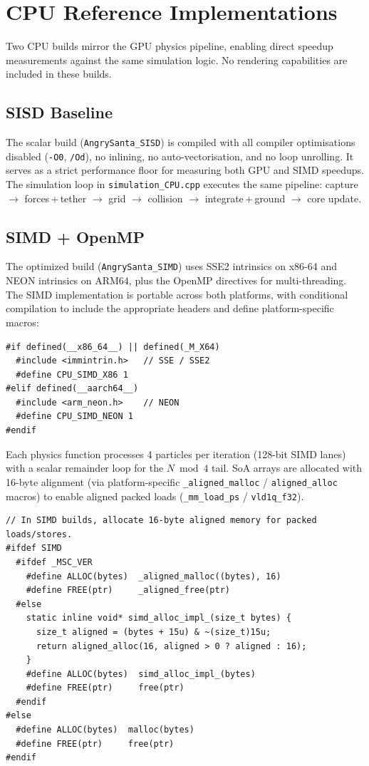 \section{CPU Reference Implementations}
\label{sec:cpu}

Two CPU builds mirror the GPU physics pipeline, enabling direct speedup
measurements against the same simulation logic. No rendering capabilities are included in these builds.

\subsection{SISD Baseline}

The scalar build (\texttt{AngrySanta\_SISD}) is compiled with all compiler
optimisations disabled (\texttt{-O0}, \texttt{/Od}), no inlining, no
auto-vectorisation, and no loop unrolling. It serves as a strict performance
floor for measuring both GPU and SIMD speedups. The simulation loop in
\texttt{simulation\_CPU.cpp} executes the same pipeline: capture $\to$
forces\,+\,tether $\to$ grid $\to$ collision $\to$ integrate\,+\,ground $\to$
core update.

\subsection{SIMD + OpenMP}

The optimized build (\texttt{AngrySanta\_SIMD}) uses SSE2 intrinsics on x86-64
and NEON intrinsics on ARM64, plus the OpenMP directives for multi-threading.
The SIMD implementation is portable across both platforms, with conditional
compilation to include the appropriate headers and define platform-specific macros:

\begin{lstlisting}
#if defined(__x86_64__) || defined(_M_X64)
  #include <immintrin.h>   // SSE / SSE2
  #define CPU_SIMD_X86 1
#elif defined(__aarch64__)
  #include <arm_neon.h>    // NEON
  #define CPU_SIMD_NEON 1
#endif
\end{lstlisting}

Each physics function processes 4 particles per iteration (128-bit SIMD lanes)
with a scalar remainder loop for the $N \bmod 4$ tail. SoA arrays are allocated
with 16-byte alignment (via platform-specific \texttt{\_aligned\_malloc} /
\texttt{aligned\_alloc} macros) to enable aligned packed loads
(\texttt{\_mm\_load\_ps} / \texttt{vld1q\_f32}).

\begin{lstlisting}
// In SIMD builds, allocate 16-byte aligned memory for packed loads/stores.
#ifdef SIMD
  #ifdef _MSC_VER
    #define ALLOC(bytes)  _aligned_malloc((bytes), 16)
    #define FREE(ptr)     _aligned_free(ptr)
  #else
    static inline void* simd_alloc_impl_(size_t bytes) {
      size_t aligned = (bytes + 15u) & ~(size_t)15u;
      return aligned_alloc(16, aligned > 0 ? aligned : 16);
    }
    #define ALLOC(bytes)  simd_alloc_impl_(bytes)
    #define FREE(ptr)     free(ptr)
  #endif
#else
  #define ALLOC(bytes)  malloc(bytes)
  #define FREE(ptr)     free(ptr)
#endif
\end{lstlisting}


